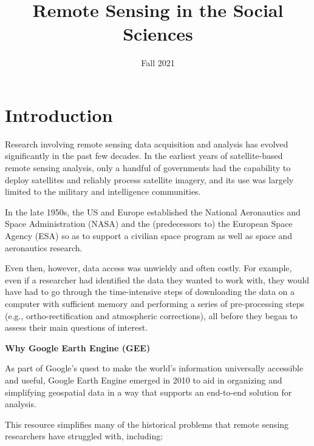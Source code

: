 \documentclass[
]{article}
\title{Remote Sensing in the Social Sciences}
\author{}
\date{\vspace{-2.5em}Fall 2021}
\begin{document}
\maketitle

{
\setcounter{tocdepth}{2}
\tableofcontents
}
\hypertarget{introduction}{%
\section*{Introduction}\label{introduction}}

Research involving remote sensing data acquisition and analysis has evolved significantly in the past few decades. In the earliest years of satellite-based remote sensing analysis, only a handful of governments had the capability to deploy satellites and reliably process satellite imagery, and its use was largely limited to the military and intelligence communities.

In the late 1950s, the US and Europe established the National Aeronautics and Space Administration (NASA) and the (predecessors to) the European Space Agency (ESA) so as to support a civilian space program as well as space and aeronautics research.

Even then, however, data access was unwieldy and often costly. For example, even if a researcher had identified the data they wanted to work with, they would have had to go through the time-intensive steps of downloading the data on a computer with sufficient memory and performing a series of pre-processing steps (e.g., ortho-rectification and atmospheric corrections), all before they began to assess their main questions of interest.

\textbf{Why Google Earth Engine (GEE) }

As part of Google's quest to make the world's information universally accessible and useful, Google Earth Engine emerged in 2010 to aid in organizing and simplifying geospatial data in a way that supports an end-to-end solution for analysis.

This resource simplifies many of the historical problems that remote sensing researchers have struggled with, including:
\end{document}
